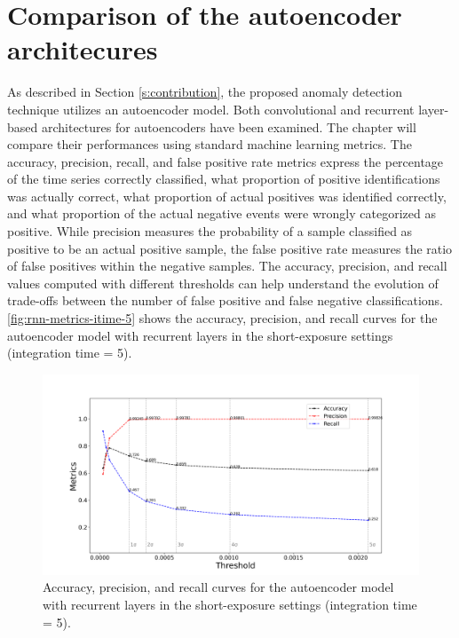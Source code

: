 \section{Comparison of the autoencoder architecures}
\label{s:architectures-comparison}
As described in Section \autoref{s:contribution}, the proposed anomaly detection technique utilizes an autoencoder model. Both convolutional and recurrent layer-based architectures for autoencoders have been examined. The chapter will compare their performances using standard machine learning metrics. The accuracy, precision, recall, and false positive rate metrics express the percentage of the time series correctly classified, what proportion of positive identifications was actually correct, what proportion of actual positives was identified correctly, and what proportion of the actual negative events were wrongly categorized as positive. While precision measures the probability of a sample classified as positive to be an actual positive sample, the false positive rate measures the ratio of false positives within the negative samples. The accuracy, precision, and recall values computed with different thresholds can help understand the evolution of trade-offs between the number of false positive and false negative classifications. \autoref{fig:rnn-metrics-itime-5} shows the accuracy, precision, and recall curves for the autoencoder model with recurrent layers in the short-exposure settings (integration time = 5). 
\begin{figure}[!htb]
    \centering
    \includegraphics[width=\linewidth]{figures/experiments/metrics/rnn_metrics_test_set_all_itime_5.png}
    \captionsetup{width=0.9\linewidth}
    \caption{Accuracy, precision, and recall curves for the autoencoder model with recurrent layers in the short-exposure settings (integration time = 5).}
    \label{fig:rnn-metrics-itime-5}
\end{figure}
